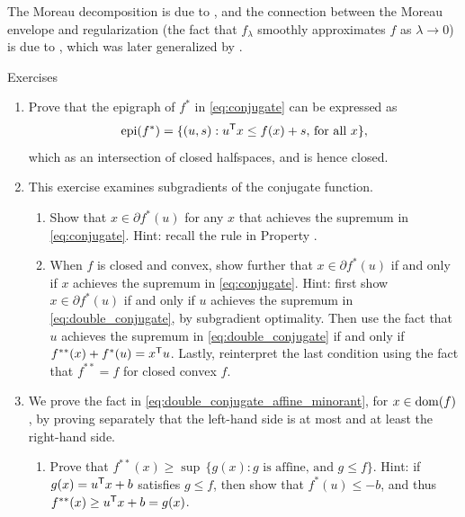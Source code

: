 The Moreau decomposition is due to \cite{moreau1962fonctions,
  moreau1965proximite}, and the connection between the Moreau envelope and
regularization (the fact that $f_\lambda$ smoothly approximates $f$ as $\lambda
\to 0$) is due to \cite{attouch1977convergence}, which was later generalized by 
\cite{attouch1981convergence}.   

\clearpage

\begin{xcb}{Exercises}
\begin{enumerate}[label=\thechapter.\arabic*]
\settowidth{\leftmargini}{0.00.\hskip\labelsep}
\item \label{ex:conjugate_closed}
  Prove that the epigraph of $f^*$ in \eqref{eq:conjugate} can be expressed as  
  \[
  \operatorname{epi}(f^*) = \{ (u,s) : u^{\mathsf{T}} x \leq f(x) + s, \, \text{for all $x$} \},
  \]
  which as an intersection of closed halfspaces, and is hence closed. 

\item \label{ex:conjugate_subgradients}
  This exercise examines subgradients of the conjugate function.

\begin{enumerate}[label=\alph*.]
\item Show that $x \in \partial f^*(u)$ for any $x$ that achieves the supremum
  in \eqref{eq:conjugate}. Hint: recall the rule in Property
  . 

\item When $f$ is closed and convex, show further that $x \in \partial f^*(u)$
  if and only if $x$ achieves the supremum in \eqref{eq:conjugate}. Hint: first
  show $x \in \partial f^*(u)$ if and only if $u$ achieves the supremum in
  \eqref{eq:double_conjugate}, by subgradient optimality. Then use the fact that
  $u$ achieves the supremum in \eqref{eq:double_conjugate} if and only if
  $f^{**}(x) + f^*(u) = x^{\mathsf{T}} u$. Lastly, reinterpret the last condition using
  the fact that $f^{**} = f$ for closed convex $f$. 
\end{enumerate}

\item \label{ex:double_conjugate_affine_minorant}
  We prove the fact in \eqref{eq:double_conjugate_affine_minorant}, for $x \in
  \operatorname{dom}(f)$, by proving separately that the left-hand side is at most and at
  least the right-hand side.     

\begin{enumerate}[label=\alph*.]
\item Prove that $f^{**}(x) \geq \sup \, \{ g(x) : \text{$g$ is affine, and $g
    \leq f$} \}$. Hint: if $g(x) = u^{\mathsf{T}} x + b$ satisfies $g \leq f$, then show
  that $f^*(u) \leq -b$, and thus $f^{**}(x) \geq u^{\mathsf{T}} x + b = g(x)$. 
  

\end{enumerate}
\end{enumerate}
\end{xcb}
